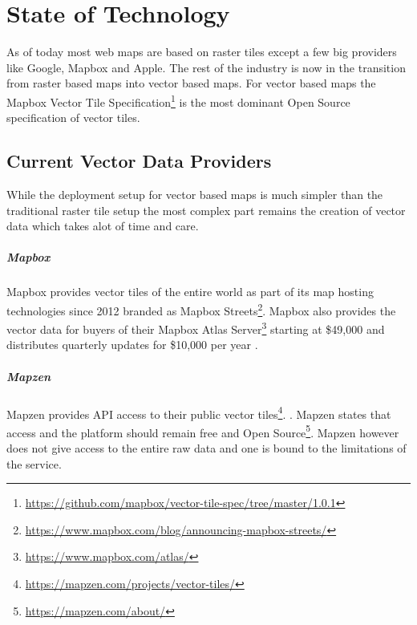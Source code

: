 \chapter{State of Technology}

As of today most web maps are based on raster tiles except a few big providers like Google, Mapbox and Apple.
The rest of the industry is now in the transition from raster based maps into vector based maps. For vector based maps the Mapbox Vector Tile Specification\footnote{\url{https://github.com/mapbox/vector-tile-spec/tree/master/1.0.1}} is the most dominant Open Source specification of vector tiles.

\section{Current Vector Data Providers}

While the deployment setup for vector based maps is much simpler than
the traditional raster tile setup the most complex part remains
the creation of vector data which takes alot of time and care.


\paragraph{Mapbox}

Mapbox provides vector tiles of the entire world as part of its
map hosting technologies since 2012 branded as Mapbox Streets\footnote{\url{https://www.mapbox.com/blog/announcing-mapbox-streets/}}. Mapbox also provides the vector data for buyers of their Mapbox Atlas Server\footnote{\url{https://www.mapbox.com/atlas/}} starting at \$49,000 and distributes quarterly updates for \$10,000 per year .

\paragraph{Mapzen}

Mapzen provides API access to their public vector tiles\footnote{\url{https://mapzen.com/projects/vector-tiles/}}.
. Mapzen states that access and the platform should remain free and Open Source\footnote{\url{https://mapzen.com/about/}}. Mapzen however
does not give access to the entire raw data and one is bound to
the limitations of the service.

